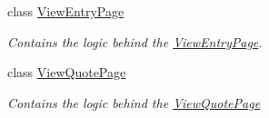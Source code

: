 \begin{DoxyCompactItemize}
class \hyperlink{class_intention_journal_1_1_view_entry_page}{View\+Entry\+Page}
\begin{DoxyCompactList}\small\item\em Contains the logic behind the \hyperlink{class_intention_journal_1_1_view_entry_page}{View\+Entry\+Page}. \end{DoxyCompactList}\item 
class \hyperlink{class_intention_journal_1_1_view_quote_page}{View\+Quote\+Page}
\begin{DoxyCompactList}\small\item\em Contains the logic behind the \hyperlink{class_intention_journal_1_1_view_quote_page}{View\+Quote\+Page} \end{DoxyCompactList}\end{DoxyCompactItemize}
